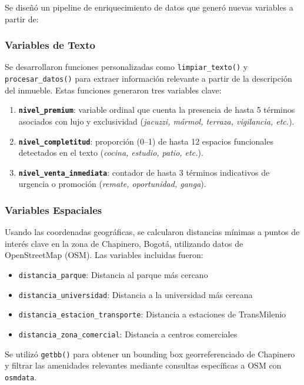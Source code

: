 \documentclass[12pt,a4paper,onecolumn]{article}
\begin{document}
Se diseñó un pipeline de enriquecimiento de datos que generó nuevas variables a partir de:

\subsubsection{Variables de Texto}

Se desarrollaron funciones personalizadas como \texttt{limpiar\_texto()} y \texttt{procesar\_datos()} para extraer información relevante a partir de la descripción del inmueble. Estas funciones generaron tres variables clave:

\begin{enumerate}
\item \textbf{\texttt{nivel\_premium}}: variable ordinal que cuenta la presencia de hasta 5 términos asociados con lujo y exclusividad (\textit{jacuzzi, mármol, terraza, vigilancia, etc.}).
\item \textbf{\texttt{nivel\_completitud}}: proporción (0--1) de hasta 12 espacios funcionales detectados en el texto (\textit{cocina, estudio, patio, etc.}).
\item \textbf{\texttt{nivel\_venta\_inmediata}}: contador de hasta 3 términos indicativos de urgencia o promoción (\textit{remate, oportunidad, ganga}).
\end{enumerate}

\subsubsection{Variables Espaciales}

Usando las coordenadas geográficas, se calcularon distancias mínimas a puntos de interés clave en la zona de Chapinero, Bogotá, utilizando datos de OpenStreetMap (OSM). Las variables incluidas fueron:

\begin{itemize}
\item \texttt{distancia\_parque}: Distancia al parque más cercano
\item \texttt{distancia\_universidad}: Distancia a la universidad más cercana  
\item \texttt{distancia\_estacion\_transporte}: Distancia a estaciones de TransMilenio
\item \texttt{distancia\_zona\_comercial}: Distancia a centros comerciales
\end{itemize}

Se utilizó \texttt{getbb()} para obtener un bounding box georreferenciado de Chapinero y filtrar las amenidades relevantes mediante consultas específicas a OSM con \texttt{osmdata}.
\end{document}
